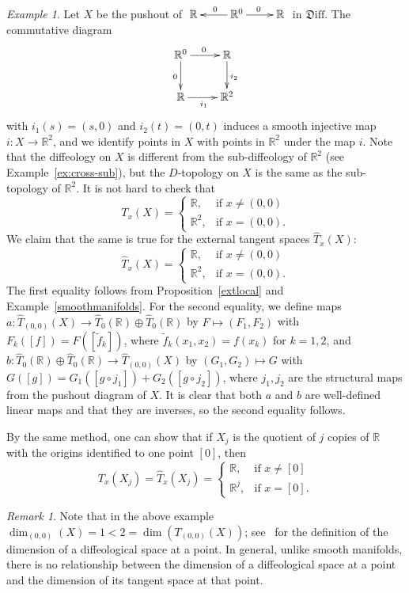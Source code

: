 \documentclass[12pt]{amsart}
\theoremstyle{remark}
\newtheorem{rem}[de]{Remark}
\newtheorem{ex}[de]{Example}
\newcommand{\ra}{\to}
\newcommand{\Diff}{{\mathfrak{D}\mathrm{iff}}}
\def \R{\mathbb{R}}
\begin{document}
\begin{ex}\label{ex:cross-pushout}
Let $X$ be the pushout of $\xymatrix{\R & \R^0 \ar[l]_0 \ar[r]^0 & \R}$ in $\Diff$.
The commutative diagram
\[
\xymatrix{\R^0 \ar[r]^0 \ar[d]_0 & \R \ar[d]^{i_2} \\ \R \ar[r]_{i_1} & \R^2}
\]
with $i_1(s)=(s,0)$ and $i_2(t)=(0,t)$ induces a smooth injective map $i:X \ra \R^2$,
and we identify points in $X$ with points in $\R^2$ under the map $i$.
Note that the diffeology on $X$ is different from the sub-diffeology of $\R^2$
(see Example~\ref{ex:cross-sub}),
but the $D$-topology on $X$ is the same as the sub-topology of $\R^2$.
It is not hard to check that
\[
T_x(X) = \begin{cases}\R,   & \text{if $x \neq (0,0)$} \\
                      \R^2, & \text{if $x=(0,0)$.}
         \end{cases}
\]
We claim that the same is true for the external tangent spaces $\hat{T}_x(X)$:
\[
\hat{T}_x(X) = \begin{cases} \R,   & \text{if $x \neq (0,0)$} \\
                             \R^2, & \text{if $x=(0,0)$.}
               \end{cases}
\]
The first equality follows from
Proposition~\ref{extlocal} and Example~\ref{smoothmanifolds}.
For the second equality, we define maps
$a:\hat{T}_{(0,0)}(X) \ra \hat{T}_0(\R) \oplus \hat{T}_0(\R)$ by
$F \mapsto (F_1,F_2)$ with $F_k([f])=F([\tilde{f}_k])$,
where $\tilde{f}_k(x_1,x_2)=f(x_k)$ for $k=1,2$,
and $b:\hat{T}_0(\R) \oplus \hat{T}_0(\R) \ra \hat{T}_{(0,0)}(X)$ by
$(G_1,G_2) \mapsto G$ with $G([g])=G_1([g \circ j_1])+G_2([g \circ j_2])$,
where $j_1,j_2$ are the structural maps from the pushout diagram of $X$.
It is clear that both $a$ and $b$ are well-defined linear maps and
that they are inverses, so the second equality follows.

By the same method, one can show that if $X_j$ is the quotient of $j$ copies of $\R$
with the origins identified to one point $[0]$, then
\[
T_x(X_j)=\hat{T}_x(X_j)=\begin{cases} \R, & \textrm{if $x \neq [0]$} \\ \R^j, & \textrm{if $x=[0]$.} \end{cases}
\]
\end{ex}

\begin{rem}\label{re:cross-pushout}
Note that in the above example $\dim_{(0,0)}(X)=1<2=\dim(T_{(0,0)}(X))$;
see~\cite{I2} for the definition of the dimension of a diffeological space at a point.
In general, unlike smooth manifolds, there is no relationship between the dimension of a diffeological space
at a point and the dimension of its tangent space at that point.
\end{rem}
\end{document}
